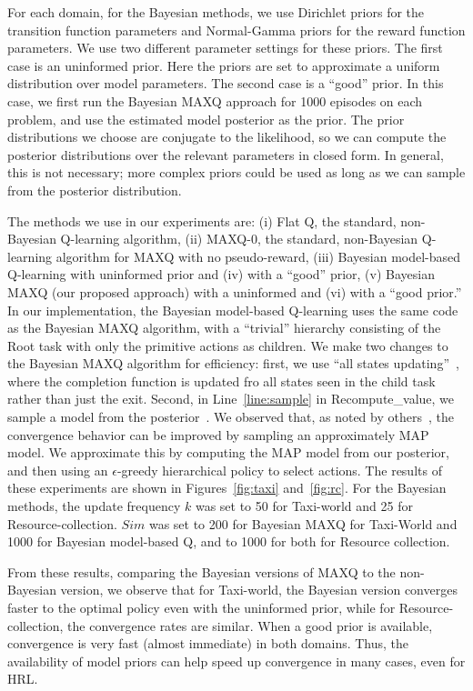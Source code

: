 For each domain, for the Bayesian methods, we use Dirichlet priors for
the transition function parameters and Normal-Gamma priors for the
reward function parameters. We use two different parameter settings for these
priors. The first case is an uninformed prior. Here the priors
 are set to approximate a uniform distribution over model
parameters. The second case is a ``good'' prior. In this case, we
first run the Bayesian MAXQ approach for 1000 episodes on each
problem, and use the estimated model posterior as the prior. The prior
distributions we choose are conjugate to the likelihood, so we can compute the
posterior distributions over the relevant parameters in closed form.
In general, this is not necessary; more complex priors could be used
as long as we can sample from the posterior distribution.

The methods we use in our experiments are: (i) Flat Q, the standard,
non-Bayesian Q-learning algorithm, (ii) MAXQ-0, the standard,
non-Bayesian Q-learning algorithm for MAXQ with no pseudo-reward,
(iii) Bayesian model-based Q-learning with uninformed prior and (iv) with
a ``good'' prior, (v) Bayesian MAXQ (our proposed approach) with a
uninformed and (vi) with a ``good prior.'' In our implementation, the
Bayesian model-based Q-learning uses the same code as the Bayesian
MAXQ algorithm, with a ``trivial'' hierarchy consisting of the Root
task with only the primitive actions as children. We make two changes
to the Bayesian MAXQ algorithm for efficiency: first, we use ``all
states updating''~\cite{d-hrl-00}, where the completion function is
updated fro all states seen in the child task rather than just the
exit. Second, in
Line~\ref{line:sample} in {\sc Recompute\_value}, we sample a model
from the posterior~\cite{Strens}. We observed that, as noted by
others~\cite{icml2007}, the convergence behavior can be improved by
sampling an approximately MAP model. We
approximate this by computing the MAP model from our posterior, and
then using an $\epsilon$-greedy hierarchical policy to select
actions. The results of these experiments are shown in
Figures~\ref{fig:taxi} and~\ref{fig:rc}. For the Bayesian methods, the
update frequency $k$ was set to 50 for {\sf Taxi-world} and 25 for
{\sf Resource-collection}. $Sim$ was set to 200 for Bayesian MAXQ for
{\sf Taxi-World} and 1000 for Bayesian model-based Q, and to 1000 for
both for {\sf Resource collection}.

From these results, comparing the Bayesian versions of MAXQ to the
non-Bayesian version, we observe that for {\sf Taxi-world}, the
Bayesian version converges faster to the optimal policy even with the
uninformed prior, while for {\sf Resource-collection}, the convergence
rates are similar. When a good prior is available, convergence is
very fast (almost immediate) in both domains. Thus, the availability
of model priors can help speed up convergence in many cases, even for HRL.

